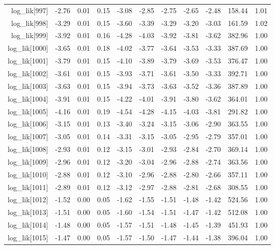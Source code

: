\begin{table}[ht]
\begin{tabular}{rrrrrrrrrrr}
  log\_lik[997] & -2.76 & 0.01 & 0.15 & -3.08 & -2.85 & -2.75 & -2.65 & -2.48 & 158.44 & 1.01 \\ 
  log\_lik[998] & -3.29 & 0.01 & 0.15 & -3.60 & -3.39 & -3.29 & -3.20 & -3.03 & 161.59 & 1.02 \\ 
  log\_lik[999] & -3.92 & 0.01 & 0.16 & -4.28 & -4.03 & -3.92 & -3.81 & -3.62 & 382.96 & 1.00 \\ 
  log\_lik[1000] & -3.65 & 0.01 & 0.18 & -4.02 & -3.77 & -3.64 & -3.53 & -3.33 & 387.69 & 1.00 \\ 
  log\_lik[1001] & -3.79 & 0.01 & 0.15 & -4.10 & -3.89 & -3.79 & -3.69 & -3.53 & 376.47 & 1.00 \\ 
  log\_lik[1002] & -3.61 & 0.01 & 0.15 & -3.93 & -3.71 & -3.61 & -3.50 & -3.33 & 392.71 & 1.00 \\ 
  log\_lik[1003] & -3.63 & 0.01 & 0.15 & -3.94 & -3.73 & -3.63 & -3.52 & -3.36 & 387.89 & 1.00 \\ 
  log\_lik[1004] & -3.91 & 0.01 & 0.15 & -4.22 & -4.01 & -3.91 & -3.80 & -3.62 & 364.01 & 1.00 \\ 
  log\_lik[1005] & -4.16 & 0.01 & 0.19 & -4.54 & -4.28 & -4.15 & -4.03 & -3.81 & 291.82 & 1.00 \\ 
  log\_lik[1006] & -3.15 & 0.01 & 0.13 & -3.40 & -3.24 & -3.15 & -3.06 & -2.90 & 363.55 & 1.00 \\ 
  log\_lik[1007] & -3.05 & 0.01 & 0.14 & -3.31 & -3.15 & -3.05 & -2.95 & -2.79 & 357.01 & 1.00 \\ 
  log\_lik[1008] & -2.93 & 0.01 & 0.12 & -3.15 & -3.01 & -2.93 & -2.84 & -2.70 & 369.14 & 1.00 \\ 
  log\_lik[1009] & -2.96 & 0.01 & 0.12 & -3.20 & -3.04 & -2.96 & -2.88 & -2.74 & 363.56 & 1.00 \\ 
  log\_lik[1010] & -2.88 & 0.01 & 0.12 & -3.10 & -2.96 & -2.88 & -2.80 & -2.66 & 357.11 & 1.00 \\ 
  log\_lik[1011] & -2.89 & 0.01 & 0.12 & -3.12 & -2.97 & -2.88 & -2.81 & -2.68 & 308.55 & 1.00 \\ 
  log\_lik[1012] & -1.52 & 0.00 & 0.05 & -1.62 & -1.55 & -1.51 & -1.48 & -1.42 & 524.56 & 1.00 \\ 
  log\_lik[1013] & -1.51 & 0.00 & 0.05 & -1.60 & -1.54 & -1.51 & -1.47 & -1.42 & 512.08 & 1.00 \\ 
  log\_lik[1014] & -1.48 & 0.00 & 0.05 & -1.57 & -1.51 & -1.48 & -1.45 & -1.39 & 451.93 & 1.00 \\ 
  log\_lik[1015] & -1.47 & 0.00 & 0.05 & -1.57 & -1.50 & -1.47 & -1.44 & -1.38 & 396.04 & 1.00 \\ 

\end{tabular}
\end{table}
